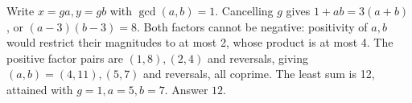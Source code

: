Write $x=ga,y=gb$ with $\gcd(a,b)=1$. Cancelling $g$ gives $1+ab=3(a+b)$, or $(a-3)(b-3)=8$. Both factors cannot be negative: positivity of $a,b$ would restrict their magnitudes to at most 2, whose product is at most 4. The positive factor pairs are $(1,8),(2,4)$ and reversals, giving $(a,b)=(4,11),(5,7)$ and reversals, all coprime. The least sum is 12, attained with $g=1,a=5,b=7$. Answer $\boxed{12}$.
